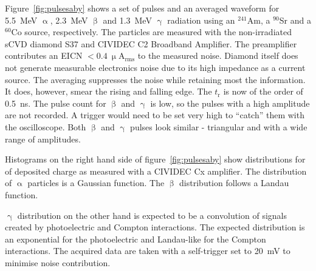 Figure~\ref{fig:pulsesaby} shows a set of pulses and an averaged waveform for 5.5~MeV $\upalpha$, 2.3~MeV $\upbeta$ and 1.3~MeV $\upgamma$ radiation using an $^{241}$Am, a $^{90}$Sr and a $^{60}$Co source, respectively. The particles are measured with the non-irradiated sCVD diamond S37 and CIVIDEC C2 Broadband Amplifier. The preamplifier contributes an EICN $< 0.4~\upmu$A$_\mathrm{rms}$ to the measured noise. Diamond itself does not generate measurable electronics noise due to its high impedance as a current source.
The averaging suppresses the noise while retaining most the information. It does, however, smear the rising and falling edge. The $t_{\mathrm{r}}$ is now of the order of 0.5~ns. The pulse count for $\upbeta$ and $\upgamma$ is low, so the pulses with a high amplitude are not recorded. A trigger would need to be set very high to ``catch'' them with the oscilloscope. Both $\upbeta$ and $\upgamma$ pulses look similar - triangular and with a wide range of amplitudes.

Histograms on the right hand side of figure~\ref{fig:pulsesaby} show distributions for of deposited charge as measured with a CIVIDEC Cx amplifier. The distribution of $\upalpha$ particles is a Gaussian function. The $\upbeta$ distribution follows a Landau function. 

$\upgamma$ distribution on the other hand is expected to be a convolution of signals created by photoelectric and Compton interactions. The expected distribution is an exponential for the photoelectric and Landau-like for the Compton interactions. The acquired data are taken with a self-trigger set to 20~mV to minimise noise contribution. %

